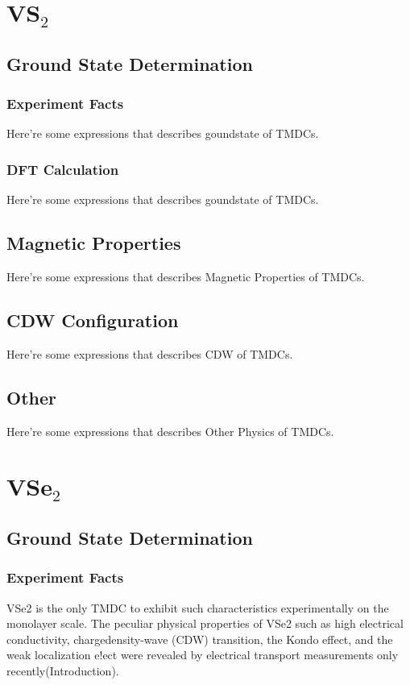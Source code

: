 \chapter{VS$_2$}

\section{Ground State Determination}
\subsection{Experiment Facts}
Here're some expressions that describes goundstate of TMDCs.

\subsection{DFT Calculation}
Here're some expressions that describes goundstate of TMDCs.

\section{Magnetic Properties}
Here're some expressions that describes Magnetic Properties of TMDCs.

\section{CDW Configuration}
Here're some expressions that describes CDW of TMDCs.

\section{Other}
Here're some expressions that describes Other Physics of TMDCs.

\chapter{VSe$_2$}

\section{Ground State Determination}
\subsection{Experiment Facts}
VSe2 is the only TMDC to exhibit such characteristics experimentally on the monolayer scale. The peculiar physical properties of VSe2 such as high electrical conductivity, chargedensity-wave (CDW) transition, the Kondo effect, and the weak localization e!ect were revealed by electrical transport measurements only recently(Introduction). 

